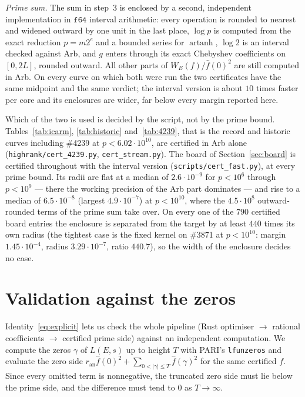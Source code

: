 \documentclass[11pt]{amsart}
\theoremstyle{remark}
\theoremstyle{definition}
\newcommand{\ran}{r_{\mathrm{an}}}
\begin{document}
\emph{Prime sum.} The sum in step~3 is enclosed by a second, independent implementation in $\mathtt{f64}$ interval arithmetic: every operation is rounded to nearest and widened outward by one unit in the last place, $\log p$ is computed from the exact reduction $p=m2^e$ and a bounded series for $\operatorname{artanh}$, $\log 2$ is an interval checked against Arb, and $g$ enters through its exact Chebyshev coefficients on $[0,2L]$, rounded outward. All other parts of $W_E(f)/\hat f(0)^2$ are still computed in Arb. On every curve on which both were run the two certificates have the same midpoint and the same
verdict; the interval version is about $10$ times faster per core and its enclosures are wider,
far below every margin reported here.

Which of the two is used is decided by the script, not by the prime bound. Tables~\ref{tab:icarm},
\ref{tab:historic} and~\ref{tab:4239}, that is the record and historic curves including \#4239 at
$p<6.02\cdot10^{10}$, are certified in Arb alone (\texttt{highrank/cert\_4239.py},
\texttt{cert\_stream.py}). The board of Section~\ref{sec:board} is certified throughout with the
interval version (\texttt{scripts/cert\_fast.py}), at every prime bound. Its radii are flat at a
median of $2.6\cdot10^{-9}$ for $p<10^6$ through $p<10^9$ --- there the working precision of the
Arb part dominates --- and rise to a median of $6.5\cdot10^{-8}$ (largest $4.9\cdot10^{-7}$) at
$p<10^{10}$, where the $4.5\cdot10^8$ outward-rounded terms of the prime sum take over. On
every one of the $790$ certified board entries the enclosure is separated from the target by at
least $440$ times its own radius (the tightest case is the fixed kernel on \#3871 at $p<10^{10}$:
margin $1.45\cdot10^{-4}$, radius $3.29\cdot10^{-7}$, ratio $440.7$), so the width of the enclosure decides no case.

\section{Validation against the zeros}\label{sec:zeros}

Identity~\eqref{eq:explicit} lets us check the whole pipeline (Rust optimiser $\to$ rational coefficients $\to$ certified prime side) against an independent computation. We compute the zeros $\gamma$ of $L(E,s)$ up to height $T$ with PARI's \texttt{lfunzeros} and evaluate the zero side $\ran\hat f(0)^2+\sum_{0<|\gamma|\le T}\hat f(\gamma)^2$ for the same certified $f$. Since every omitted term is nonnegative, the truncated zero side must lie below the prime side, and the difference must tend to $0$ as $T\to\infty$.
\end{document}
